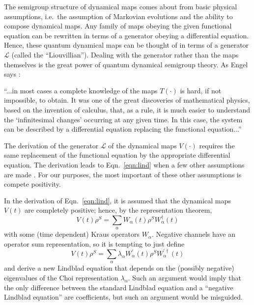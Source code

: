 The semigroup structure of dynamical maps comes about from basic physical assumptions, i.e.\ the assumption of Markovian evolutions and the ability to compose dynamical maps.  Any family of maps obeying the given functional equation can be rewritten in terms of a generator obeying a differential equation.  Hence, these quantum dynamical maps can be thought of in terms of a generator $\mathcal{L}$ (called the ``Liouvillian'').  Dealing with the generator rather than the maps themselves is the great power of quantum dynamical semigroup theory.  As Engel says \cite{Engel1999}:

``...in most cases a complete knowledge of the maps $T(\cdot)$ is hard, if not impossible, to obtain.  It was one of the great discoveries of mathematical physics, based on the invention of calculus, that, as a rule, it is much easier to understand the `infinitesimal changes' occurring at any given time.  In this case, the system can be described by a differential equation replacing the functional equation...''

The derivation of the generator $\mathcal{L}$ of the dynamical maps $V(\cdot)$ requires the same replacement of the functional equation by the appropriate differential equation.  The derivation leads to Eqn.\ \ref{eqn:lind} when a few other assumptions are made \cite{Breuer2007}.  For our purposes, the most important of these other assumptions is compete positivity.

In the derivation of Eqn.\ \ref{eqn:lind}, it is assumed that the dynamical maps $V(t)$ are completely positive; hence, by the representation theorem,
$$
V(t)\rho^S = \sum_{\alpha} W_{\alpha}(t)\rho^S W_{\alpha}^\dagger(t)
$$
with some (time dependent) Kraus operators $W_\alpha$.  Negative channels have an operator sum representation, so it is tempting to just define
$$
V(t)\rho^S = \sum_\alpha \lambda_\alpha W_\alpha^\prime(t) \rho^S W_\alpha^{\prime\dagger}(t)
$$
and derive a new Lindblad equation that depends on the (possibly negative) eigenvalues of the Choi representation $\lambda_\alpha$.  Such an argument would imply that the only difference between the standard Lindblad equation and a ``negative Lindblad equation'' are coefficients, but such an argument would be misguided.

